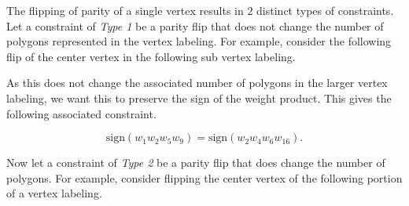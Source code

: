\documentclass[12pt]{article}
\theoremstyle{plain}
\theoremstyle{definition}
\theoremstyle{remark}
\theoremstyle{definition}
\newcommand{\cell}[4]{ \draw[thick] ( #1 , #2 ) rectangle ( #3 , #4 );}
\newcommand{\lablnode}[3]{\node[shape=circle,draw=none,fill=none, inner sep=0pt,minimum size=5pt] (A) at ( #1 , #2 ) {#3};}
\newcommand{\lablvertex}[3]{\node[shape=circle,draw=none,fill=white, inner sep=2pt,minimum size=5pt] (A) at ( #1 , #2 ) {#3};}
\begin{document}
The flipping of parity of a single vertex results in $2$ distinct types of constraints. Let a constraint of \textit{Type 1} be a parity flip that does not change the number of polygons represented in the vertex labeling. For example, consider the following flip of the center vertex in the following sub vertex labeling.

\begin{center}
\end{center}

As this does not change the associated number of polygons in the larger vertex labeling, we want this to preserve the sign of the weight product. This gives the following associated constraint. 

$$\text{sign}(w_{1}w_{2}w_{5}w_{9}) = \text{sign}(w_{2}w_{4}w_{6}w_{16}).$$

Now let a constraint of \textit{Type 2} be a parity flip that does change the number of polygons. For example, consider flipping the center vertex of the following portion of a vertex labeling.
\end{document}
